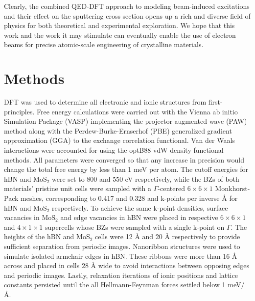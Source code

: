 \documentclass{article}
\begin{document}
Clearly, the combined QED-DFT approach to modeling beam-induced excitations and
their effect on the sputtering cross section opens up a rich and diverse field
of physics for both theoretical and experimental exploration.
We hope that this work and the work it may stimulate can eventually enable the
use of electron beams for precise atomic-scale engineering of crystalline
materials.

\section{Methods}
\label{sec:methods}

DFT \cite{Hohenberg1964, Kohn1965} was used to determine all electronic and
ionic structures from first-principles.
Free energy calculations were carried out with the Vienna ab initio Simulation
Package (VASP) \cite{Kresse1996, Kresse1996a} implementing the projector
augmented wave (PAW) method \cite{Blochl1994} along with the
Perdew-Burke-Ernserhof (PBE) generalized gradient approximation (GGA) to the
exchange correlation functional. \cite{Perdew1996}
Van der Waals interactions were accounted for using the optB88-vdW density
functional methods. \cite{Klimes2010, Klimes2011}
All parameters were converged so that any increase in precision would change
the total free energy by less than 1 meV per atom.
The cutoff energies for hBN and MoS$_2$ were set to 800 and 550 eV
respectively, while the BZs of both materials' pristine unit cells were sampled
with a $\Gamma$-centered $6\times6\times1$ Monkhorst-Pack meshes,
\cite{Monkhorst1976} corresponding to 0.417 and 0.328 and k-points per inverse
{\AA} for hBN and MoS$_2$ respectively.
To achieve the same k-point densities, surface vacancies in MoS$_2$ and edge
vacancies in hBN were placed in respective $6\times6\times1$ and
$4\times1\times1$ supercells whose BZs were sampled with a single k-point on
$\Gamma$.
The heights of the hBN and MoS$_2$ cells were 12 {\AA} and 20 {\AA}
respectively to provide sufficient separation from periodic images.
Nanoribbon structures were used to simulate isolated armchair edges in hBN.
These ribbons were more than 16 {\AA} across and placed in cells 28 {\AA} wide
to avoid interactions between opposing edges and periodic images.
Lastly, relaxation iterations of ionic positions and lattice constants
persisted until the all Hellmann-Feynman forces settled below 1 
meV/{\AA}.
\end{document}
